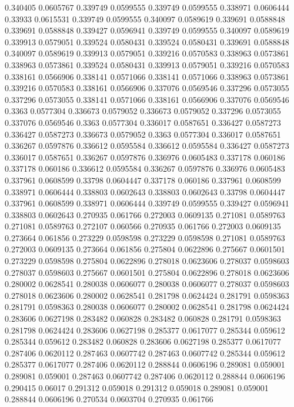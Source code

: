0.340405 0.0605767
0.339749 0.0599555
0.339749 0.0599555
0.338971 0.0606444
0.33933 0.0615531
0.339749 0.0599555
0.340097 0.0589619
0.339691 0.0588848
0.339691 0.0588848
0.339427 0.0596941
0.339749 0.0599555
0.340097 0.0589619
0.339913 0.0579051
0.339524 0.0580431
0.339524 0.0580431
0.339691 0.0588848
0.340097 0.0589619
0.339913 0.0579051
0.339216 0.0570583
0.338963 0.0573861
0.338963 0.0573861
0.339524 0.0580431
0.339913 0.0579051
0.339216 0.0570583
0.338161 0.0566906
0.338141 0.0571066
0.338141 0.0571066
0.338963 0.0573861
0.339216 0.0570583
0.338161 0.0566906
0.337076 0.0569546
0.337296 0.0573055
0.337296 0.0573055
0.338141 0.0571066
0.338161 0.0566906
0.337076 0.0569546
0.3363 0.0577304
0.336673 0.0579052
0.336673 0.0579052
0.337296 0.0573055
0.337076 0.0569546
0.3363 0.0577304
0.336017 0.0587651
0.336427 0.0587273
0.336427 0.0587273
0.336673 0.0579052
0.3363 0.0577304
0.336017 0.0587651
0.336267 0.0597876
0.336612 0.0595584
0.336612 0.0595584
0.336427 0.0587273
0.336017 0.0587651
0.336267 0.0597876
0.336976 0.0605483
0.337178 0.060186
0.337178 0.060186
0.336612 0.0595584
0.336267 0.0597876
0.336976 0.0605483
0.337961 0.0608599
0.33798 0.0604447
0.337178 0.060186
0.337961 0.0608599
0.338971 0.0606444
0.338803 0.0602643
0.338803 0.0602643
0.33798 0.0604447
0.337961 0.0608599
0.338971 0.0606444
0.339749 0.0599555
0.339427 0.0596941
0.338803 0.0602643
0.270935 0.061766
0.272003 0.0609135
0.271081 0.0589763
0.271081 0.0589763
0.272107 0.060566
0.270935 0.061766
0.272003 0.0609135
0.273664 0.061856
0.273229 0.0598598
0.273229 0.0598598
0.271081 0.0589763
0.272003 0.0609135
0.273664 0.061856
0.275804 0.0622896
0.275667 0.0601501
0.273229 0.0598598
0.275804 0.0622896
0.278018 0.0623606
0.278037 0.0598603
0.278037 0.0598603
0.275667 0.0601501
0.275804 0.0622896
0.278018 0.0623606
0.280002 0.0628541
0.280038 0.0606077
0.280038 0.0606077
0.278037 0.0598603
0.278018 0.0623606
0.280002 0.0628541
0.281798 0.0624424
0.281791 0.0598363
0.281791 0.0598363
0.280038 0.0606077
0.280002 0.0628541
0.281798 0.0624424
0.283606 0.0627198
0.283482 0.060828
0.283482 0.060828
0.281791 0.0598363
0.281798 0.0624424
0.283606 0.0627198
0.285377 0.0617077
0.285344 0.059612
0.285344 0.059612
0.283482 0.060828
0.283606 0.0627198
0.285377 0.0617077
0.287406 0.0620112
0.287463 0.0607742
0.287463 0.0607742
0.285344 0.059612
0.285377 0.0617077
0.287406 0.0620112
0.288844 0.0606196
0.289081 0.059001
0.289081 0.059001
0.287463 0.0607742
0.287406 0.0620112
0.288844 0.0606196
0.290415 0.06017
0.291312 0.059018
0.291312 0.059018
0.289081 0.059001
0.288844 0.0606196
0.270534 0.0603704
0.270935 0.061766
